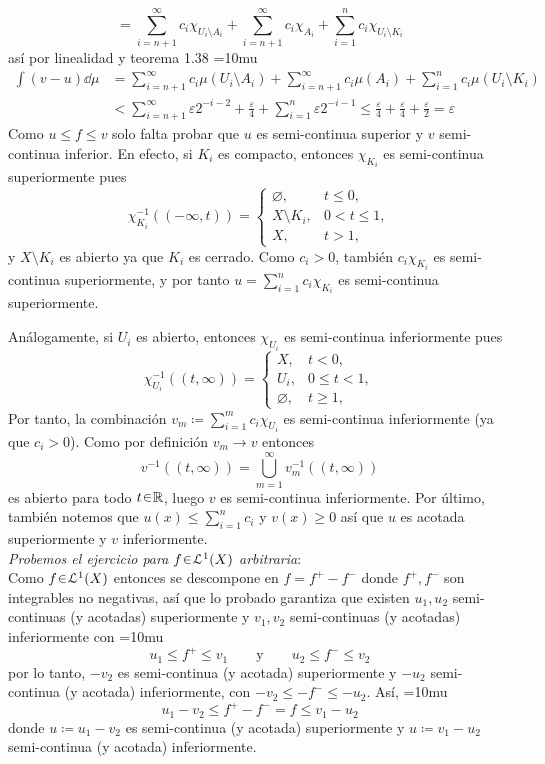 \begin{sol}
{\[= \sum^{\infty}_{i=n+1}c_i\chi_{U_i\setminus A_i} + \sum^{\infty}_{i=n+1}c_i\chi_{A_i} + \sum_{i=1}^n c_i \chi_{U_i\setminus K_i}
\]
}
así por linealidad y teorema 1.38
{\thickmuskip=10mu
\begin{align*}
\int (v-u) \dd{\mu} 
&= \sum^{\infty}_{i=n+1}c_i\mu({U_i\setminus A_i}) + \sum^{\infty}_{i=n+1}c_i\mu({A_i}) + \sum_{i=1}^n c_i \mu({U_i\setminus K_i})\\
&< \sum^{\infty}_{i=n+1}\varepsilon2^{-i-2} + \frac{\varepsilon}{4} + \sum_{i=1}^n \varepsilon2^{-i-1}
\leq \frac{\varepsilon}{4} + \frac{\varepsilon}{4} + \frac{\varepsilon}{2} = \varepsilon
\end{align*}
}
Como $u \leq f \leq v$ solo falta probar que $u$ es semi-continua superior y $v$ semi-continua inferior. En efecto, si $K_i$ es compacto, entonces $\chi_{K_i}$ es semi-continua superiormente pues
\[
\chi_{K_i}^{-1}((-\infty,t))=
\begin{cases}
\varnothing,& t\le0,\\
X\setminus K_i,& 0<t\le1,\\
X,& t>1,
\end{cases}
\]
y $X\setminus K_i$ es abierto ya que $K_i$ es cerrado. Como $c_i>0$, también $c_i\chi_{K_i}$ es semi-continua superiormente, y por tanto $u=\sum_{i=1}^n c_i\chi_{K_i}$ es semi-continua superiormente.

Análogamente, si $U_i$ es abierto, entonces $\chi_{U_i}$ es semi-continua inferiormente pues
\[
\chi_{U_i}^{-1}((t,\infty))=
\begin{cases}
X,& t<0,\\
U_i,& 0\le t<1,\\
\varnothing,& t\ge1,
\end{cases}
\]
Por tanto, la combinación $v_m\coloneq \sum_{i=1}^m c_i\chi_{U_i}$ es semi-continua inferiormente (ya que $c_i>0$). Como por definición $v_m \to v$ entonces
\[
v^{-1}((t,\infty))
=\bigcup_{m=1}^\infty v_m^{-1}((t,\infty))
\]
es abierto para todo $t\en\mathbb{R}$, luego $v$ es semi-continua inferiormente. Por último, también notemos que $u(x) \le \sum^n_{i=1} c_i$ y $v(x) \ge 0$ así que $u$ es acotada superiormente y $v$ inferiormente.
\medskip\\
\emph{Probemos el ejercicio para $f\en\mathcal{L}^1(X)$ arbitraria}:\\
Como $f\en\mathcal{L}^1(X)$ entonces se descompone en $f= f^+ - f^-$ donde $f^+,f^-$ son integrables no negativas, así que lo probado garantiza que existen $u_1,u_2$ semi-continuas (y acotadas) superiormente y $v_1,v_2$ semi-continuas (y acotadas) inferiormente con
{\thickmuskip=10mu
\[
u_1 \leq f^+ \leq v_1
\qquad\text{y}\qquad
u_2 \leq f^- \leq v_2
\]
}%
por lo tanto, $-v_2$ es semi-continua (y acotada) superiormente y $-u_2$ semi-continua (y acotada) inferiormente, con $-v_2 \le -f^- \le -u_2$. Así, 
{\thickmuskip=10mu
\[
u_1-v_2 \leq f^+-f^- = f \leq v_1-u_2
\]
}%
donde $u \coloneq u_1-v_2$ es semi-continua (y acotada) superiormente y $u\coloneq v_1-u_2$ semi-continua (y acotada) inferiormente.
\end{sol}


